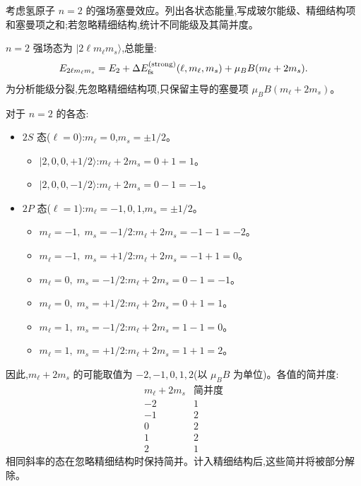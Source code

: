 \begin{question}
考虑氢原子 $n=2$ 的强场塞曼效应。列出各状态能量,写成玻尔能级、精细结构项和塞曼项之和;若忽略精细结构,统计不同能级及其简并度。
\begin{solution}
$n=2$ 强场态为 $|2\ell m_\ell m_s\rangle$,总能量:
\[
E_{2\ell m_\ell m_s}=E_2+\Delta E_{\rm fs}^{\rm(strong)}(\ell,m_\ell,m_s)+\mu_B B(m_\ell+2m_s).
\]
为分析能级分裂,先忽略精细结构项,只保留主导的塞曼项 $\mu_BB(m_\ell+2m_s)$。

对于 $n=2$ 的各态:
\begin{itemize}
\item $2S$ 态($\ell=0$):$m_\ell=0$,$m_s=\pm1/2$。
  \begin{itemize}
  \item $|2,0,0,+1/2\rangle$:$m_\ell+2m_s=0+1=1$。
  \item $|2,0,0,-1/2\rangle$:$m_\ell+2m_s=0-1=-1$。
  \end{itemize}
\item $2P$ 态($\ell=1$):$m_\ell=-1,0,1$,$m_s=\pm1/2$。
  \begin{itemize}
  \item $m_\ell=-1,\;m_s=-1/2$:$m_\ell+2m_s=-1-1=-2$。
  \item $m_\ell=-1,\;m_s=+1/2$:$m_\ell+2m_s=-1+1=0$。
  \item $m_\ell=0,\;m_s=-1/2$:$m_\ell+2m_s=0-1=-1$。
  \item $m_\ell=0,\;m_s=+1/2$:$m_\ell+2m_s=0+1=1$。
  \item $m_\ell=1,\;m_s=-1/2$:$m_\ell+2m_s=1-1=0$。
  \item $m_\ell=1,\;m_s=+1/2$:$m_\ell+2m_s=1+1=2$。
  \end{itemize}
\end{itemize}

因此,$m_\ell+2m_s$ 的可能取值为 $-2,-1,0,1,2$(以 $\mu_BB$ 为单位)。各值的简并度:
\[
\begin{array}{c|c}
m_\ell+2m_s & \text{简并度}\\ \hline
-2 & 1\\
-1 & 2\\
0 & 2\\
1 & 2\\
2 & 1
\end{array}
\]
相同斜率的态在忽略精细结构时保持简并。计入精细结构后,这些简并将被部分解除。
\end{solution}
\end{question}


